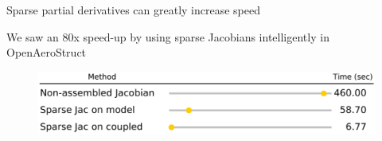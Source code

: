 \documentclass[aspectratio=169, usenames,dvipsnames, 14pt]{beamer}
\begin{document}
\begin{frame}{Sparse partial derivatives can greatly increase speed}

	We saw an 80x speed-up by using sparse Jacobians intelligently in OpenAeroStruct \newline \newline
	
	\begin{figure}
		\includegraphics[scale=.5]{images/slide_38_derivatives.png}
	\end{figure}
	
\end{frame}   
\end{document}
